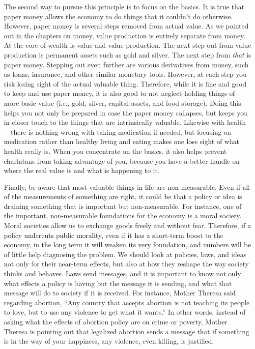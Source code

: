 The second way to pursue this principle is to focus on the basics. It is
true that paper money allows the economy to do things that it
couldn't do otherwise. However, paper money is several
steps removed from actual value. As we pointed out in the chapters on
money, value production is entirely separate from money. At the core
of wealth is value and value production.  The next step
out from value production is permanent assets such as gold and silver.
The next step from \textit{that} is paper money. Stepping out even
further are various derivatives from money, such as loans, insurance,
and other similar monetary tools. However, at each step you risk losing
sight of the actual valuable thing. Therefore, while it is fine and
good to keep and use paper money, it is also good to not neglect
holding things of more basic value (i.e., gold, silver,
capital assets, and food storage). Doing this
helps you not only be prepared in case the paper money collapses,
but keeps you in closer touch
to the things that are intrinsically valuable. Likewise with
health---there is nothing wrong with taking medication if needed, but
focusing on medication rather than healthy living and eating makes
one lose sight of what health really
is. When you concentrate on the basics, it also helps prevent
charlatans from taking advantage of you, because you have a better
handle on where the real value is and what is happening to it.

Finally, be aware that most valuable things in life are non-measurable.
Even if all of the measurements of something are right, it could be
that a policy or idea is draining something that is important but
non-measurable.  For
instance, one of the important, non-measurable foundations for the
economy is a moral society.  Moral societies allow us to exchange goods
freely and without fear.  Therefore, if a policy undercuts public
morality, even if it has a short-term boost to the economy, in the long
term it will weaken its very foundation, and numbers will be of little
help diagnosing the problem.  We should look at policies, laws, and
ideas not only for their near-term effects, but also at how they
reshape the way society thinks and behaves. Laws send messages, and it
is important to know not only what effects a policy is having but the
message it is sending, and what that message will do to society if it
is received. For instance, Mother Theresa said
regarding abortion,
``Any country that accepts abortion is not teaching its people to love,
but to use any violence to get what it wants.''  In other words, instead
of asking what the effects of abortion policy are on crime or poverty,
Mother Theresa is pointing out that legalized abortion sends a message
that if something is in the way of your happiness, any violence, even
killing, is justified.  

